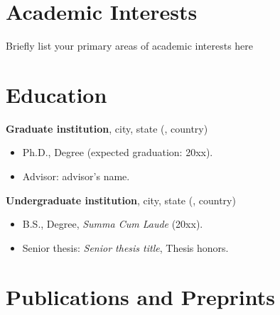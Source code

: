 \documentclass{cv_style}
\begin{document}

    \begin{center}  

    
	\end{center}
	
	\section{Academic Interests}
	Briefly list your primary areas of academic interests here

	\section{Education}
		\begin{trivlist}
			\item \textbf{Graduate institution},  city, state (, country)
				\begin{itemize}
					\item Ph.D., Degree (expected graduation: 20xx).
					\item Advisor: advisor's name.
				\end{itemize}
				
			\item \textbf{Undergraduate institution}, city, state (, country)
				\begin{itemize}
					\item B.S., Degree, \textit{Summa Cum Laude} (20xx).
					\item Senior thesis: {\em Senior thesis title}, Thesis honors.
				\end{itemize}
		\end{trivlist}
		

	\section{Publications and Preprints}
		\begin{etaremune}			
					\item {}
							
					\item {}
					
		\end{etaremune}
		
\end{document}
